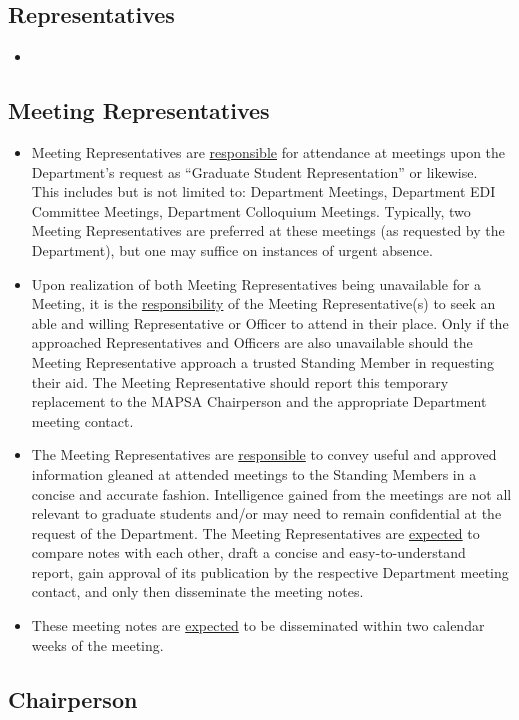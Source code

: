 \documentclass[8pt]{article}
\begin{document}
	\subsection{Representatives}
	\begin{itemize}
		\item
	\end{itemize}
	\subsection{Meeting Representatives}
	\begin{itemize}
		\item Meeting Representatives are \underline{responsible} for attendance at meetings upon the Department's request as ``Graduate Student Representation'' or likewise.\\
		This includes but is not limited to: Department Meetings, Department EDI Committee Meetings, Department Colloquium Meetings. Typically, two Meeting Representatives are preferred at these meetings (as requested by the Department), but one may suffice on instances of urgent absence. 
		\item Upon realization of both Meeting Representatives being unavailable for a Meeting, it is the \underline{responsibility} of the Meeting Representative(s) to seek an able and willing Representative or Officer to attend in their place. Only if the approached Representatives and Officers are also unavailable should the Meeting Representative approach a trusted Standing Member in requesting their aid. The Meeting Representative should report this temporary replacement to the MAPSA Chairperson and the appropriate Department meeting contact.
		\item The Meeting Representatives are \underline{responsible} to convey useful and approved information gleaned at attended meetings to the Standing Members in a concise and accurate fashion. Intelligence gained from the meetings are not all relevant to graduate students and/or may need to remain confidential at the request of the Department. The Meeting Representatives are \underline{expected} to compare notes with each other, draft a concise and easy-to-understand report, gain approval of its publication by the respective Department meeting contact, and only then disseminate the meeting notes.
		\item These meeting notes are \underline{expected} to be disseminated within two calendar weeks of the meeting.
	\end{itemize} 
	\subsection{Chairperson}
\end{document}

